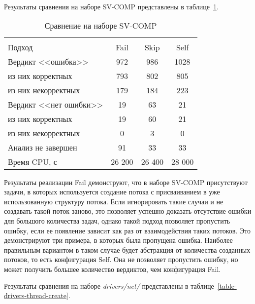 Результаты сравнения на наборе SV-COMP представлены в таблице~\ref{table-svcomp-thread-create}.

  \begin{table}[h]\footnotesize \centering
    \caption{Сравнение на наборе SV-COMP}
  	\label{table-svcomp-thread-create}
    \begin{tabular}{ | l | c | c | c |}
      \hline
      		& 		\multicolumn{3}{c|}{\theory}  \\
      Подход         				& Fail 	& Skip 	& Self  	\\ \hline
      Вердикт <<ошибка>> 				& 972   & 986   & 1028       \\ 
  \hspace{0.5cm} из них корректных 	& 793 	& 802 	& 805    	\\ 
  \hspace{0.5cm} из них некорректных & 179 	& 184 	& 223     	\\ \hline
      Вердикт <<нет ошибки>>  		& 19    & 63    & 21       	\\ 
  \hspace{0.5cm} из них корректных 	& 19 	& 60    & 21      	\\
  \hspace{0.5cm} из них некорректных & 0 	& 3    	& 0     	\\ \hline
      Анализ не завершен       		& 91    & 33    & 33    	\\ \hline
      Время CPU, с   				& 26 200 & 26 400 & 28 000  \\ 
      \hline
    \end{tabular}
  \end{table}

Результаты реализации Fail демонструют, что в наборе SV-COMP присутствуют задачи, в которых используется создание потока с присваиванием в уже использованную структуру потока. 
Если игнорировать такие случаи и не создавать такой поток заново, это позволяет успешно доказать отсутствие ошибки для большого количества задач, однако такой подход позволяет пропустить ошибку, если ее появление зависит как раз от взаимодействия таких потоков.
Это демонстрируют три примера, в которых была пропущена ошибка.
Наиболее правильным вариантом в таком случае будет абстракция от количества созданных потоков, то есть конфигурация Self. 
Она не позволяет пропустить ошибку, но может получить большее количество вердиктов, чем конфигурация Fail.

Результаты сравнения на наборе \textit{drivers/net/} представлены в таблице~\ref{table-drivers-thread-create}.

